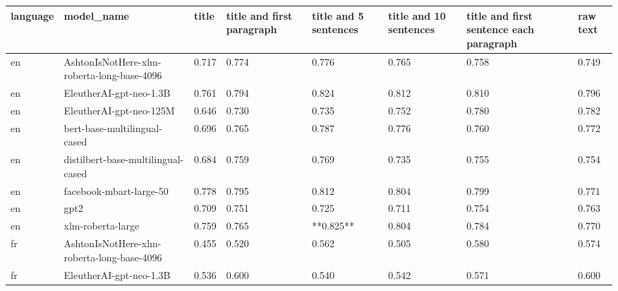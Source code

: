 \begin{tabular}{llllllll}
\toprule
language &                                 model\_name & title & title and first paragraph & title and 5 sentences & title and 10 sentences & title and first sentence each paragraph &  raw text \\
\midrule
      en & AshtonIsNotHere-xlm-roberta-long-base-4096 & 0.717 &                     0.774 &                 0.776 &                  0.765 &                                   0.758 &     0.749 \\
      en &                    EleutherAI-gpt-neo-1.3B & 0.761 &                     0.794 &                 0.824 &                  0.812 &                                   0.810 &     0.796 \\
      en &                    EleutherAI-gpt-neo-125M & 0.646 &                     0.730 &                 0.735 &                  0.752 &                                   0.780 &     0.782 \\
      en &               bert-base-multilingual-cased & 0.696 &                     0.765 &                 0.787 &                  0.776 &                                   0.760 &     0.772 \\
      en &         distilbert-base-multilingual-cased & 0.684 &                     0.759 &                 0.769 &                  0.735 &                                   0.755 &     0.754 \\
      en &                    facebook-mbart-large-50 & 0.778 &                     0.795 &                 0.812 &                  0.804 &                                   0.799 &     0.771 \\
      en &                                       gpt2 & 0.709 &                     0.751 &                 0.725 &                  0.711 &                                   0.754 &     0.763 \\
      en &                          xlm-roberta-large & 0.759 &                     0.765 &             **0.825** &                  0.804 &                                   0.784 &     0.770 \\
      fr & AshtonIsNotHere-xlm-roberta-long-base-4096 & 0.455 &                     0.520 &                 0.562 &                  0.505 &                                   0.580 &     0.574 \\
      fr &                    EleutherAI-gpt-neo-1.3B & 0.536 &                     0.600 &                 0.540 &                  0.542 &                                   0.571 &     0.600 \\

\end{tabular}

